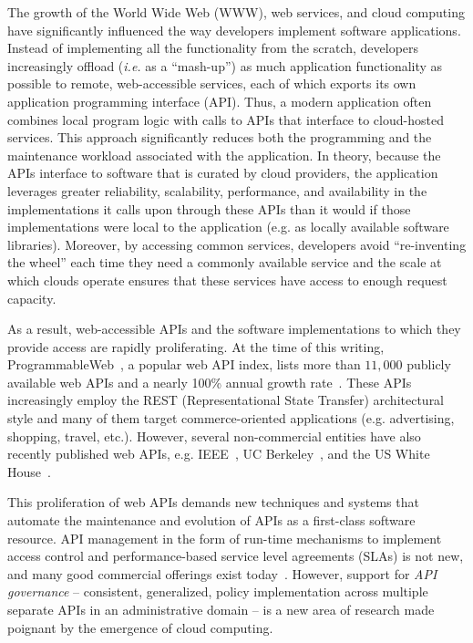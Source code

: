 The growth of the World Wide Web (WWW), web services, and cloud computing have
significantly influenced the way developers implement software applications.
Instead of implementing all the functionality from the scratch, developers
increasingly offload ({\em i.e.} as a ``mash-up'') as much application functionality 
as possible 
to remote,
web-accessible services, each of which exports its own application programming
interface (API).  Thus, a modern application often combines local program logic
with calls to APIs that interface to cloud-hosted services.
This approach significantly reduces both the programming and
the maintenance workload associated with the application.  In theory, because
the APIs interface to software that is curated by cloud providers, the
application leverages greater
reliability, scalability, performance, 
and availability in the implementations it calls upon through these APIs than
it would if those implementations were local to the application
(e.g. as locally available software libraries).
Moreover, by accessing common services, developers avoid ``re-inventing the
wheel'' each time they need a commonly available service and the scale at
which clouds operate ensures that these services have access to enough request
capacity.

As a result, web-accessible APIs and the software implementations to which
they provide access are rapidly proliferating.
At the time of this writing, 
ProgrammableWeb~\cite{pweb}, a popular web API index, lists more than $11,000$
publicly available
web APIs and a nearly 100\% annual growth rate~\cite{pweb_growth}. 
These APIs increasingly employ the REST (Representational State Transfer) architectural style and 
many of them target commerce-oriented applications (e.g.
advertising, shopping, travel, etc.).
However, several non-commercial entities have also recently
published web 
APIs, e.g. IEEE~\cite{ieeeapis}, UC Berkeley~\cite{ucbapis}, and the US White
House~\cite{whitehouseapis}. 

This proliferation of web APIs demands new techniques and systems that
automate the maintenance and evolution of APIs as a first-class software
resource.  API management in the form of run-time mechanisms to implement
access control and performance-based service level agreements (SLAs) is not
new, and many good commercial offerings exist today~\cite{3scale,apigee,layer7}.   
However, support for \textit{API governance} -- consistent, generalized, policy
implementation across multiple separate APIs in an administrative domain --
is a new area of research made poignant by the emergence of cloud computing.

